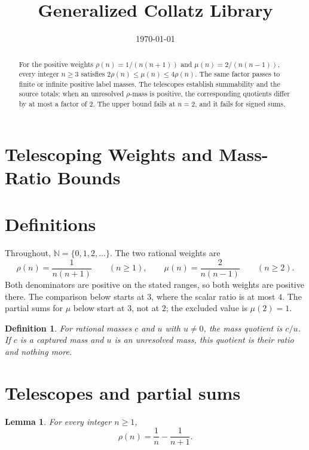 \documentclass[11pt,letterpaper]{article}
\title{Generalized Collatz Library}
\author{}
\date{\today}
\newcommand{\N}{\mathbb{N}}
\newtheorem{lemma}[theorem]{Lemma}
\newtheorem{definition}[theorem]{Definition}
\begin{document}
\maketitle
\section*{Telescoping Weights and Mass-Ratio Bounds}

\begin{abstract}
For the positive weights $\rho(n)=1/(n(n+1))$ and $\mu(n)=2/(n(n-1))$, every integer $n\ge 3$ satisfies $2\rho(n)\le\mu(n)\le 4\rho(n)$. The same factor passes to finite or infinite positive label masses. The telescopes establish summability and the source totals; when an unresolved $\rho$-mass is positive, the corresponding quotients differ by at most a factor of $2$. The upper bound fails at $n=2$, and it fails for signed sums.
\end{abstract}

\section{Definitions}

Throughout, $\N=\{0,1,2,\ldots\}$. The two rational weights are
\begin{equation*}
\rho(n)=\frac{1}{n(n+1)}\qquad(n\ge 1),
\qquad
\mu(n)=\frac{2}{n(n-1)}\qquad(n\ge 2).
\end{equation*}
Both denominators are positive on the stated ranges, so both weights are positive there. The comparison below starts at $3$, where the scalar ratio is at most $4$. The partial sums for $\mu$ below start at $3$, not at $2$; the excluded value is $\mu(2)=1$.

\begin{definition}
For rational masses $c$ and $u$ with $u\neq 0$, the \emph{mass quotient} is $c/u$. If $c$ is a captured mass and $u$ is an unresolved mass, this quotient is their ratio and nothing more.
\end{definition}

\section{Telescopes and partial sums}

\begin{lemma}
\label{lem:rho-step}
For every integer $n\ge 1$,
\begin{equation*}
\rho(n)=\frac{1}{n}-\frac{1}{n+1}.
\end{equation*}
\end{lemma}
\end{document}
